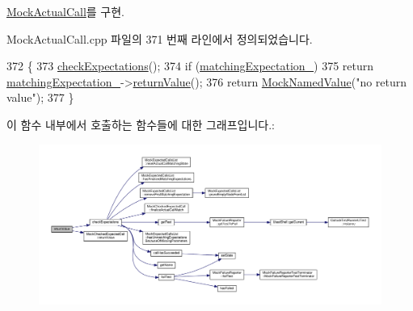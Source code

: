 \hyperlink{class_mock_actual_call_a6c5987c6227778f648a3ee566cd09592}{Mock\+Actual\+Call}를 구현.



Mock\+Actual\+Call.\+cpp 파일의 371 번째 라인에서 정의되었습니다.


\begin{DoxyCode}
372 \{
373     \hyperlink{class_mock_checked_actual_call_aaf94db2d926ab0a1cae9fc65c7eec54c}{checkExpectations}();
374     \textcolor{keywordflow}{if} (\hyperlink{class_mock_checked_actual_call_aca733859eb143b7a7bf611a39d94d6f6}{matchingExpectation\_})
375         \textcolor{keywordflow}{return} \hyperlink{class_mock_checked_actual_call_aca733859eb143b7a7bf611a39d94d6f6}{matchingExpectation\_}->\hyperlink{class_mock_checked_expected_call_a1afc0a670963abd85b5d7f7c8af305a4}{returnValue}();
376     \textcolor{keywordflow}{return} \hyperlink{class_mock_named_value}{MockNamedValue}(\textcolor{stringliteral}{"no return value"});
377 \}
\end{DoxyCode}


이 함수 내부에서 호출하는 함수들에 대한 그래프입니다.\+:
\nopagebreak
\begin{figure}[H]
\begin{center}
\leavevmode
\includegraphics[width=350pt]{class_mock_checked_actual_call_a97defb904464d58fdd3e1c8f1d937fc6_cgraph}
\end{center}
\end{figure}




